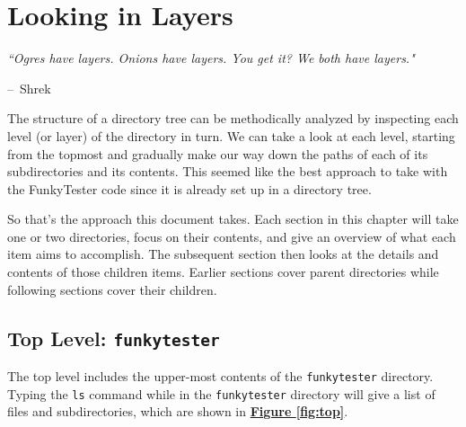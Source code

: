 \documentclass{report}
\makeatletter
\newenvironment{chapquote}[2][2em]
  {\setlength{\@tempdima}{#1}%
   \def\chapquote@author{#2}%
   \parshape 1 \@tempdima \dimexpr\textwidth-2\@tempdima\relax%
   \itshape}
  {\par\normalfont\hfill--\ \chapquote@author\hspace*{\@tempdima}\par\bigskip}
\makeatother
\begin{document}
\chapter{Looking in Layers} 
\begin{chapquote}{Shrek \textit{}}
``Ogres have layers. Onions have layers. You get it? We both have layers."
\end{chapquote}

The structure of a directory tree can be methodically analyzed by inspecting each level (or layer) of the directory in turn. We can take a look at each level, starting from the topmost and gradually make our way down the paths of each of its  subdirectories and its contents. This seemed like the best approach to take with the FunkyTester code since it is already set up in a directory tree.

So that's the approach this document takes. Each section in this chapter will take one or two directories, focus  on their contents, and give an overview of what each item aims to accomplish. The subsequent section then looks at the details and contents of those children items. Earlier sections cover parent directories while following sections cover their children.

\section{Top Level: \texttt{funkytester}}
The top level includes the upper-most contents of the \texttt{funkytester} directory. Typing the \texttt{ls} command while in the \texttt{funkytester} directory will give a list of files and subdirectories, which are shown in \hyperref[fig:top]{\textbf{Figure \ref{fig:top}}}.\\
	\begin{minipage}{\linewidth}
		\label{fig:top}
	\end{minipage} 
\vspace{5pt}%
\end{document}
